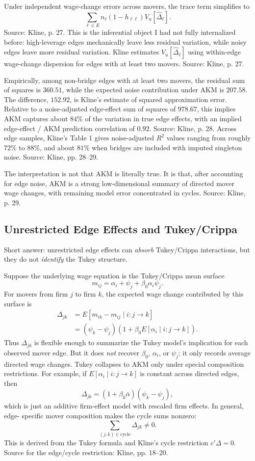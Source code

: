 \documentclass[11pt]{article}
\begin{document}
Under independent wage-change errors across movers, the trace term simplifies to
\[
\sum_{\ell\in E} n_\ell(1-h_{\ell\ell})V_u[\hat\Delta_\ell].
\]
Source: Kline, p. 27. This is the inferential object I had not fully internalized before:
high-leverage edges mechanically leave less residual variation, while noisy edges leave
more residual variation. Kline estimates $V_u[\hat\Delta_\ell]$ using within-edge
wage-change dispersion for edges with at least two movers. Source: Kline, p. 27.

Empirically, among non-bridge edges with at least two movers, the residual sum of
squares is $360.51$, while the expected noise contribution under AKM is $207.58$.
The difference, $152.92$, is Kline's estimate of squared approximation error. Relative
to a noise-adjusted edge-effect sum of squares of $978.67$, this implies AKM captures
about $84\%$ of the variation in true edge effects, with an implied edge-effect / AKM
prediction correlation of $0.92$. Source: Kline, p. 28. Across edge samples, Kline's
Table 1 gives noise-adjusted $R^2$ values ranging from roughly $72\%$ to $88\%$,
and about $81\%$ when bridges are included with imputed singleton noise. Source:
Kline, pp. 28--29.

The interpretation is not that AKM is literally true. It is that, after accounting for
edge noise, AKM is a strong low-dimensional summary of directed mover wage changes,
with remaining model error concentrated in cycles. Source: Kline, p. 29.

\subsection{Unrestricted Edge Effects and Tukey/Crippa}

Short answer: unrestricted edge effects can \emph{absorb} Tukey/Crippa interactions,
but they do not \emph{identify} the Tukey structure.

Suppose the underlying wage equation is the Tukey/Crippa mean surface
\[
m_{ij}=\alpha_i+\psi_j+\beta_0\alpha_i\psi_j.
\]
For movers from firm $j$ to firm $k$, the expected wage change contributed by this
surface is
\[
\begin{aligned}
\Delta_{jk}
&=E[m_{ik}-m_{ij}\mid i:j\to k] \\
&=(\psi_k-\psi_j)\left(1+\beta_0 E[\alpha_i\mid i:j\to k]\right).
\end{aligned}
\tag{derived}
\]
Thus $\Delta_{jk}$ is flexible enough to summarize the Tukey model's implication
for each observed mover edge. But it does \emph{not} recover $\beta_0$, $\alpha_i$,
or $\psi_j$; it only records average directed wage changes. Tukey collapses to AKM
only under special composition restrictions. For example, if
$E[\alpha_i\mid i:j\to k]$ is constant across directed edges, then
\[
\Delta_{jk}=(1+\beta_0\bar\alpha)(\psi_k-\psi_j),
\]
which is just an additive firm-effect model with rescaled firm effects. In general, edge-
specific mover composition makes the cycle sums nonzero:
\[
\sum_{(j,k)\in \text{cycle}}\Delta_{jk}\neq 0.
\]
This is derived from the Tukey formula and Kline's cycle restriction $c'\Delta=0$.
Source for the edge/cycle restriction: Kline, pp. 18--20.
\end{document}
